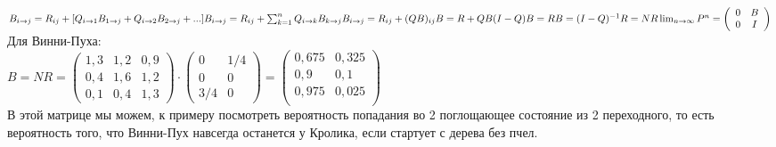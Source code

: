 $B_{i\to j}=R_{ij}+[Q_{i\to 1}B_{1 \to j}+Q_{i\to 2}B_{2\to j}+...]\\
B_{i\to j}=R_{ij}+\sum_{k=1}^{n}Q_{i\to k}B_{k\to j}\\
B_{i\to j}=R_{ij}+(QB)_{ij}\\
B=R+QB\\
(I-Q)B=R\\
B=(I-Q)^{-1}R=NR\\
\lim_{n\to \infty}P^n=\left(\begin{array}{cc}
0 & B\\
0 & I\\
\end{array}\right)$\\
Для Винни-Пуха:\\
$B=NR=
\left(\begin{array}{ccc}
1,3 & 1,2 & 0,9\\
0,4 & 1,6 & 1,2\\
0,1 & 0,4 & 1,3
\end{array}\right)\cdot
\left(\begin{array}{cc}
0 & 1/4\\
0 & 0\\
3/4 & 0
\end{array}\right)=
\left(\begin{array}{cc}
0,675 & 0,325\\
0,9 & 0,1\\
0,975 & 0,025\\ 
\end{array}\right)$\\
В этой матрице мы можем, к примеру посмотреть вероятность попадания во 2 поглощающее состояние из 2 переходного, то есть вероятность того, что Винни-Пух навсегда останется у Кролика, если стартует с дерева без пчел.




















